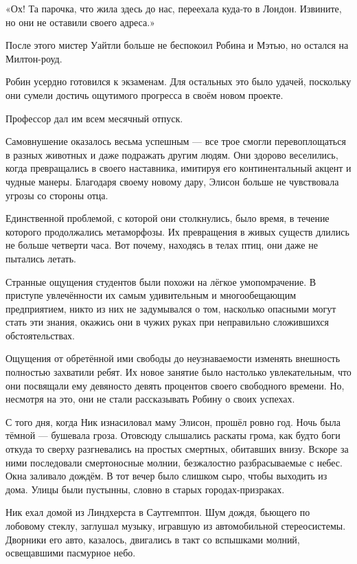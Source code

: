 \documentclass[a5paper, 9pt,
final, openany, twoside=true]{memoir}
\begin{document}
«Ох! Та парочка, что жила здесь до нас, переехала куда-то в Лондон. Извините, но они не оставили своего адреса.»

После этого мистер Уайтли больше не беспокоил Робина и Мэтью, но остался на Милтон-роуд.\bigskip

Робин усердно готовился к экзаменам. Для остальных это было удачей, поскольку они сумели достичь ощутимого прогресса в своём новом проекте.

Профессор дал им всем месячный отпуск.

Самовнушение оказалось весьма успешным — все трое смогли перевоплощаться в разных животных и даже подражать другим людям. Они здорово веселились, когда  превращались в своего наставника, имитируя его континентальный акцент и чудные манеры. Благодаря своему новому дару, Элисон больше не чувствовала угрозы со стороны отца.

Единственной проблемой, с которой они столкнулись, было время, в течение которого продолжались метаморфозы. Их превращения в живых существ длились не больше четверти часа. Вот почему, находясь в телах птиц, они даже не пытались летать.

Странные ощущения студентов были похожи на лёгкое умопомрачение. В приступе увлечённости их самым удивительным и многообещающим предприятием, никто из них не задумывался о том, насколько опасными могут стать эти знания, окажись они в чужих руках при неправильно сложившихся обстоятельствах.

Ощущения от обретённой ими свободы до неузнаваемости изменять внешность полностью захватили ребят. Их новое занятие было настолько увлекательным, что они посвящали ему девяносто девять процентов своего свободного времени. Но, несмотря на это, они не стали рассказывать Робину о своих успехах.\bigskip

С того дня, когда Ник изнасиловал маму Элисон, прошёл ровно год. Ночь была тёмной — бушевала гроза. Отовсюду слышались раскаты грома, как будто боги откуда то сверху разгневались на простых смертных, обитавших внизу. Вскоре за ними последовали смертоносные молнии, безжалостно разбрасываемые с небес. Окна заливало дождём. В тот вечер было слишком сыро, чтобы выходить из дома. Улицы были пустынны, словно в старых городах-призраках.

Ник ехал домой из Линдхерста в Саутгемптон. Шум дождя, бьющего по лобовому стеклу, заглушал музыку, игравшую из автомобильной стереосистемы. Дворники его авто, казалось, двигались в такт со вспышками молний, освещавшими пасмурное небо.
\end{document}
